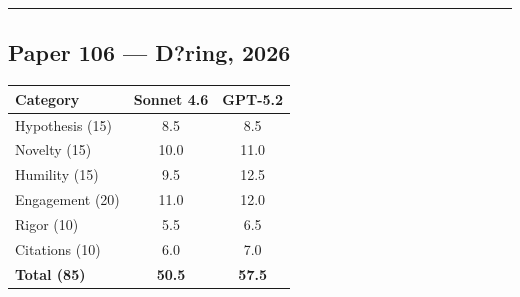 \documentclass[11pt]{article}
\begin{document}
\bigskip
\hrule
\bigskip

\subsection*{Paper 106 --- D?ring, 2026}

\medskip

\begin{tabular}{lcc}
\toprule
\textbf{Category} & \textbf{Sonnet 4.6} & \textbf{GPT-5.2} \\
\midrule
Hypothesis (15) & 8.5 & 8.5 \\
Novelty (15) & 10.0 & 11.0 \\
Humility (15) & 9.5 & 12.5 \\
Engagement (20) & 11.0 & 12.0 \\
Rigor (10) & 5.5 & 6.5 \\
Citations (10) & 6.0 & 7.0 \\
\midrule
\textbf{Total (85)} & \textbf{50.5} & \textbf{57.5} \\
\bottomrule
\end{tabular}

\bigskip
\end{document}
